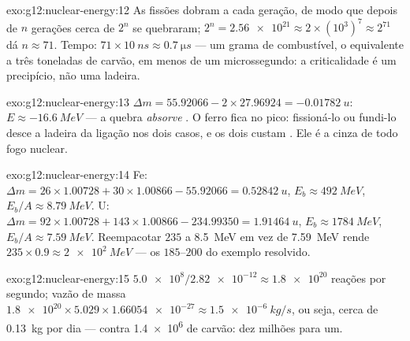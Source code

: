 \begin{solution}{exo:g12:nuclear-energy:12}
As fissões dobram a cada geração, de modo que depois de $n$ gerações
cerca de $2^n$  se quebraram;
$2^{n} = \num{2.56e21} \approx 2 \times (10^{3})^{7} \approx 2^{71}$ dá
$n \approx 71$. Tempo: $71 \times \qty{10}{ns} \approx \qty{0.7}{\micro s}$
--- um grama de combustível, o equivalente a três toneladas de carvão, em
menos de um microssegundo: a criticalidade é um precipício, não uma
ladeira.
\end{solution}

\begin{solution}{exo:g12:nuclear-energy:13}
$\Delta m = 55.92066 - 2 \times 27.96924 = \qty{-0.01782}{u}$:
$E \approx \qty{-16.6}{MeV}$ --- a quebra \emph{absorve} . O ferro
fica no pico: fissioná-lo ou fundi-lo desce a ladeira da ligação nos dois
casos, e os dois custam . Ele é a cinza de todo fogo nuclear.
\end{solution}

\begin{solution}{exo:g12:nuclear-energy:14}
Fe: $\Delta m = 26 \times 1.00728 + 30 \times 1.00866 - 55.92066 =
\qty{0.52842}{u}$, $E_b \approx \qty{492}{MeV}$,
$E_b/A \approx \qty{8.79}{MeV}$. U:
$\Delta m = 92 \times 1.00728 + 143 \times 1.00866 - 234.99350 =
\qty{1.91464}{u}$, $E_b \approx \qty{1784}{MeV}$,
$E_b/A \approx \qty{7.59}{MeV}$. Reempacotar $235$  a
\qty{8.5}{MeV} em vez de \qty{7.59}{MeV} rende
$235 \times 0.9 \approx \qty{2e2}{MeV}$ --- os $185$--$200$ do exemplo
resolvido.
\end{solution}

\begin{solution}{exo:g12:nuclear-energy:15}
$\num{5.0e8}/\num{2.82e-12} \approx \num{1.8e20}$ reações por segundo;
vazão de massa
$\num{1.8e20} \times 5.029 \times \num{1.66054e-27} \approx
\qty{1.5e-6}{kg/s}$, ou seja, cerca de \qty{0.13}{kg} por dia --- contra
\num{1.4e6}  de carvão: dez milhões para um.
\end{solution}

